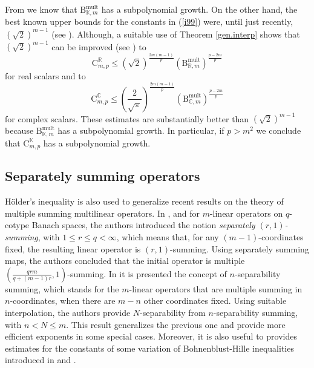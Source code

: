 \documentclass[10pt]{amsart}
\numberwithin{equation}{section}
\begin{document}
From \cite{bps} we know that $\mathrm{B}_{\mathbb{K},m}^{\mathrm{mult}}$ has
a subpolynomial growth. On the other hand, the best known upper bounds for
the constants in (\ref{i99}) were, until just recently, $\left( \sqrt{2}\right) ^{m-1}$ (see \cite{alb, n, dimant}). Although, a suitable use of
Theorem \ref{gen.interp} shows that $\left( \sqrt{2}\right) ^{m-1}$ can be
improved (see \cite{aps}) to
\begin{equation*}
\mathrm{C}_{m,p}^{\mathbb{R}}\leq \left( \sqrt{2}\right) ^{\frac{2m\left(
m-1\right) }{p}}\left( \mathrm{B}_{\mathbb{R},m}^{\mathrm{mult}}\right) ^{\frac{p-2m}{p}}
\end{equation*}for real scalars and to
\begin{equation*}
\mathrm{C}_{m,p}^{\mathbb{C}}\leq \left( \frac{2}{\sqrt{\pi }}\right) ^{\frac{2m(m-1)}{p}}\left( \mathrm{B}_{\mathbb{C},m}^{\mathrm{mult}}\right) ^{\frac{p-2m}{p}}
\end{equation*}
for complex scalars. These estimates are substantially better than $\left(\sqrt{2}\right) ^{m-1}$ because $\mathrm{B}_{\mathbb{K},m}^{\mathrm{mult}}$
has a subpolynomial growth. In particular, if $p>m^{2}$ we conclude that $\mathrm{C}_{m,p}^{\mathbb{K}}$ has a subpolynomial growth.

\subsection{Separately summing operators}

H\"{o}lder's inequality is also used to generalize recent results on the
theory of multiple summing multilinear operators. In \cite{defa}, and for $m$-linear operators on $q$-cotype Banach spaces, the authors introduced the
notion \emph{separately $(r,1)$-summing}, with $1\leq r\leq q<\infty$, which
means that, for any $(m-1)$-coordinates fixed, the resulting linear operator
is $(r,1)$-summing. Using separately summing maps, the authors concluded
that the initial operator is multiple $\left( \frac{qrm}{q+\left(m-1\right)r}, 1\right)$-summing. In \cite{joedson} it is presented the concept of $n$-separability summing, which stands for the $m$-linear operators that are
multiple summing in $n$-coordinates, when there are $m-n$ other coordinates
fixed. Using suitable interpolation, the authors provide $N$-separability
from $n$-separability summing, with $n<N\leq m$. This result generalizes the
previous one and provide more efficient exponents in some special cases.
Moreover, it is also useful to provides estimates for the constants of some
variation of Bohnenblust-Hille inequalities introduced in \cite[Appendix A]{ddss} and \cite{111}.
\end{document}

